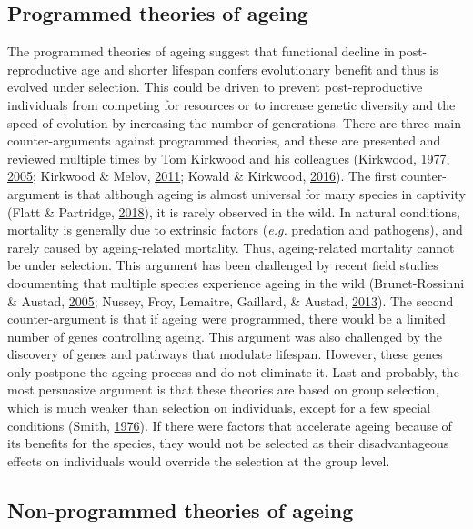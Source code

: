 \documentclass[12pt,twoside]{unicam}
\begin{document}
\hypertarget{introProgAgeing}{%
\subsection{Programmed theories of ageing}\label{introProgAgeing}}

The programmed theories of ageing suggest that functional decline in post-reproductive age and shorter lifespan confers evolutionary benefit and thus is evolved under selection. This could be driven to prevent post-reproductive individuals from competing for resources or to increase genetic diversity and the speed of evolution by increasing the number of generations. There are three main counter-arguments against programmed theories, and these are presented and reviewed multiple times by Tom Kirkwood and his colleagues (Kirkwood, \protect\hyperlink{ref-Kirkwood1977}{1977}, \protect\hyperlink{ref-Kirkwood2005}{2005}; Kirkwood \& Melov, \protect\hyperlink{ref-Kirkwood2011}{2011}; Kowald \& Kirkwood, \protect\hyperlink{ref-Kowald2016}{2016}). The first counter-argument is that although ageing is almost universal for many species in captivity (Flatt \& Partridge, \protect\hyperlink{ref-Flatt2018}{2018}), it is rarely observed in the wild. In natural conditions, mortality is generally due to extrinsic factors (\emph{e.g.} predation and pathogens), and rarely caused by ageing-related mortality. Thus, ageing-related mortality cannot be under selection. This argument has been challenged by recent field studies documenting that multiple species experience ageing in the wild (Brunet-Rossinni \& Austad, \protect\hyperlink{ref-Brunet-Rossinni2005}{2005}; Nussey, Froy, Lemaitre, Gaillard, \& Austad, \protect\hyperlink{ref-Nussey2013}{2013}). The second counter-argument is that if ageing were programmed, there would be a limited number of genes controlling ageing. This argument was also challenged by the discovery of genes and pathways that modulate lifespan. However, these genes only postpone the ageing process and do not eliminate it. Last and probably, the most persuasive argument is that these theories are based on group selection, which is much weaker than selection on individuals, except for a few special conditions (Smith, \protect\hyperlink{ref-Smith1976}{1976}). If there were factors that accelerate ageing because of its benefits for the species, they would not be selected as their disadvantageous effects on individuals would override the selection at the group level.

\hypertarget{intrononprogAgeing}{%
\subsection{Non-programmed theories of ageing}\label{intrononprogAgeing}}
\end{document}
